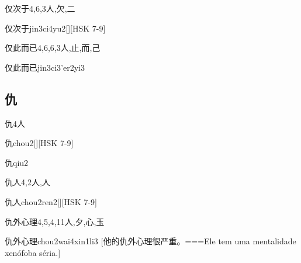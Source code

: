 \begin{Entry}{仅次于}{4,6,3}{⼈,⽋,⼆}
  \begin{Phonetics}{仅次于}{jin3ci4yu2}[][HSK 7-9]
  \end{Phonetics}
\end{Entry}

\begin{Entry}{仅此而已}{4,6,6,3}{⼈,⽌,⽽,⼰}
  \begin{Phonetics}{仅此而已}{jin3ci3'er2yi3}
  \end{Phonetics}
\end{Entry}

\subsection*{仇}

\begin{Entry}{仇}{4}{⼈}
  \begin{Phonetics}{仇}{chou2}[][HSK 7-9]
  \end{Phonetics}
  \begin{Phonetics}{仇}{qiu2}
  \end{Phonetics}
\end{Entry}

\begin{Entry}{仇人}{4,2}{⼈,⼈}
  \begin{Phonetics}{仇人}{chou2ren2}[][HSK 7-9]
  \end{Phonetics}
\end{Entry}

\begin{Entry}{仇外心理}{4,5,4,11}{⼈,⼣,⼼,⽟}
  \begin{Phonetics}{仇外心理}{chou2wai4xin1li3}
    [他的仇外心理很严重。===Ele tem uma mentalidade xenófoba séria.]
  \end{Phonetics}
\end{Entry}


